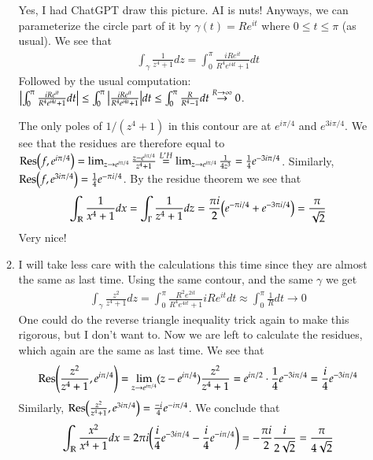 \documentclass[12pt]{article}
\def\mbb#1{\mathbb{#1}}
\def \R{\mbb{R}}
\theoremstyle{definition}
\theoremstyle{remark}
\begin{document}
\begin{enumerate}[leftmargin=\labelsep]
\begin{enumerate}
			Yes, I had ChatGPT draw this picture. AI is nuts! Anyways, we can parameterize the circle part of it by $\gamma(t) = Re^{it}$ where $0 \leq t \leq \pi$ (as usual). We see that
			\begin{align*}
				\int_\gamma \frac{1}{z^4+1}dz = \int_0^\pi \frac{iRe^{it}}{R^4e^{i4t}+1}dt
			\end{align*}
			Followed by the usual computation: $\qty|\int_0^\pi \frac{iRe^{it}}{R^4e^{i4t}+1}dt| \leq \int_0^\pi \qty|\frac{iRe^{it}}{R^4e^{i4t}+1}|dt \leq \int_0^\pi \frac{R}{R^4-1}dt \overset{R \to \infty}{\to} 0$.
			
			The only poles of $1/(z^4+1)$ in this contour are at $e^{i\pi/4}$ and $e^{3i\pi/4}$. We see that the residues are therefore equal to
			$\Res(f, e^{i\pi/4}) = \lim_{z \to e^{i\pi/4}} \frac{z-e^{i\pi/4}}{z^4+1} \overset{L'H}{=} \lim_{z \to e^{i\pi/4}} \frac{1}{4z^3} = \frac14 e^{-3i\pi/4}$. Similarly, $\Res(f, e^{3i\pi/4}) = \frac14 e^{-\pi i/4}$. By the residue theorem we see that \begin{align*}
				\int_\R \frac{1}{x^4+1}dx = \int_{\Gamma} \frac{1}{z^4+1}dz = \frac{\pi i}{2} \qty(e^{-\pi i/4} + e^{-3\pi i/4}) = \frac{\pi}{\sqrt{2}}
			\end{align*}
			Very nice!
			\item I will take less care with the calculations this time since they are almost the same as last time. Using the same contour, and the same $\gamma$ we get
			\begin{align*}
				\int_\gamma \frac{z^2}{z^4+1}dz = \int_0^\pi \frac{R^2e^{2it}}{R^4e^{4it}+1} iRe^{it}dt \approx \int_0^\pi \frac1Rdt \to 0
			\end{align*}
			One could do the reverse triangle inequality trick again to make this rigorous, but I don't want to. Now we are left to calculate the residues, which again are the same as last time. We see that
			\begin{align*}
				\Res(\frac{z^2}{z^4+1}, e^{i\pi/4}) = \lim_{z \to e^{i\pi/4}} (z-e^{i\pi/4}) \frac{z^2}{z^4+1} = e^{i\pi/2} \cdot \frac14 e^{-3i\pi/4} = \frac i4 e^{-3i\pi/4}
			\end{align*}
			Similarly, $\Res(\frac{z^2}{z^4+1}, e^{3i\pi/4}) = \frac{-i}4 e^{-i\pi/4}$. We conclude that
			\begin{align*}
				\int_{\R} \frac{x^2}{x^4+1}dx = 2\pi i \qty(\frac i4 e^{-3i\pi/4} - \frac i4 e^{-i\pi/4}) = -\frac{\pi i}{2} \frac{i}{2\sqrt{2}} = \frac{\pi}{4\sqrt{2}}
			\end{align*}
		\end{enumerate}

\end{enumerate}
\end{document}
